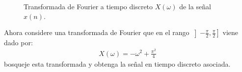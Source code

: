 \documentclass[
  11pt,
  letterpaper,
   addpoints,
   answers
  ]{exam}
\begin{document}
\begin{questions}
\begin{figure}[H]
\caption{Transformada de Fourier a tiempo discreto $X(\omega)$ de la señal $x(n)$.}
\end{figure}
Ahora considere una transformada de Fourier que en el rango $\left] -\frac{\pi}{2}, \frac{\pi}{2} \right]$ viene dado por:
\begin{align}
  X(\omega)= -\omega^{2} + \frac{\pi^{2}}{4}
\end{align}
bosqueje esta transformada y obtenga la señal en tiempo discreto asociada.
\begin{solution}


\end{solution}
\end{questions}
\end{document}
